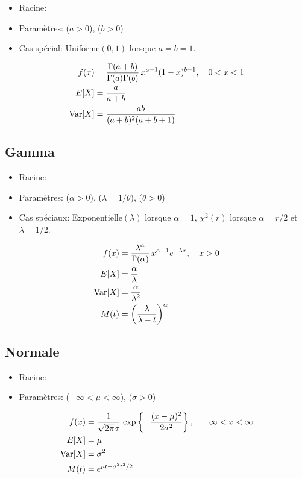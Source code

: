 \begin{itemize}
\item Racine: 
\item Paramètres:  ($a > 0$),
       ($b > 0$)
\end{itemize}
\begin{itemize}
\item Cas spécial: Uniforme$(0, 1)$ lorsque $a = b = 1$.
\end{itemize}
\begin{align*}
  f(x)
  &= \frac{\Gamma(a + b)}{\Gamma(a) \Gamma(b)}\,
  x^{a - 1} (1 - x)^{b - 1}, \quad 0 < x < 1 \\
  E [ X ]
  &= \frac{a}{a + b} \\
  \operatorname{Var} [ X ]
  &= \frac{a b}{(a + b)^2 (a + b + 1)}
\end{align*}


\subsection{Gamma}
\label{sec:distributions:gamma}

\begin{itemize}
\item Racine: 
\item Paramètres:  ($\alpha > 0$),
         ($\lambda = 1/\theta$),
        ($\theta > 0$)
\end{itemize}
\begin{itemize}
\item Cas spéciaux: Exponentielle$(\lambda)$ lorsque $\alpha = 1$,
  $\chi^2(r)$ lorsque $\alpha = r/2$ et $\lambda = 1/2$.
\end{itemize}
\begin{align*}
  f(x)
  &= \frac{\lambda^\alpha}{\Gamma(\alpha)}\, x^{\alpha - 1} e^{-\lambda x},
  \quad x > 0 \\
  E [ X ]
  &= \frac{\alpha}{\lambda} \\
  \operatorname{Var} [ X ]
  &= \frac{\alpha}{\lambda^2} \\
  M(t)
  &= \left( \frac{\lambda}{\lambda - t} \right)^\alpha
\end{align*}


\subsection{Normale}
\label{sec:distributions:normale}
\begin{itemize}
\item Racine: 
\item Paramètres:  ($-\infty < \mu < \infty$), 
  ($\sigma > 0$)
\end{itemize}
\begin{align*}
  f(x)
  &= \frac{1}{\sqrt{2\pi} \sigma}\,
  \exp\left\{ -\frac{(x - \mu)^2}{2\sigma^2} \right\}, \quad
  -\infty < x < \infty \\
  E [ X ]
  &= \mu \\
  \operatorname{Var} [ X ]
  &= \sigma^2 \\
  M(t)
  &= e^{\mu t + \sigma^2 t^2/2}
\end{align*}

